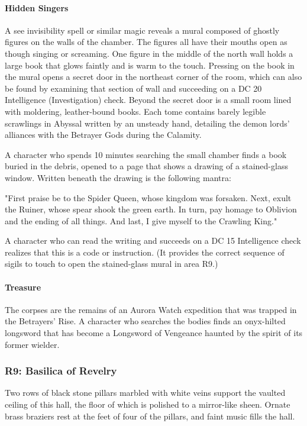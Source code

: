 \documentclass[10pt,a4paper,twoside,bg=print,twocolumn,openany,nodeprecatedcode]{dndbook}
\begin{document}
\paragraph{Hidden Singers}
A see invisibility spell or similar magic reveals a mural composed of ghostly figures on the walls of the chamber. The figures all have their mouths open as though singing or screaming. One figure in the middle of the north wall holds a large book that glows faintly and is warm to the touch. Pressing on the book in the mural opens a secret door in the northeast corner of the room, which can also be found by examining that section of wall and succeeding on a DC 20 Intelligence (Investigation) check. Beyond the secret door is a small room lined with moldering, leather-bound books. Each tome contains barely legible scrawlings in Abyssal written by an unsteady hand, detailing the demon lords' alliances with the Betrayer Gods during the Calamity.

A character who spends 10 minutes searching the small chamber finds a book buried in the debris, opened to a page that shows a drawing of a stained-glass window. Written beneath the drawing is the following mantra:

\begin{DndReadAloud}{}
"First praise be to the Spider Queen, whose kingdom was forsaken. Next, exult the Ruiner, whose spear shook the green earth. In turn, pay homage to Oblivion and the ending of all things. And last, I give myself to the Crawling King."

\end{DndReadAloud}

A character who can read the writing and succeeds on a DC 15 Intelligence check realizes that this is a code or instruction. (It provides the correct sequence of sigils to touch to open the stained-glass mural in area R9.)

\paragraph{Treasure}
The corpses are the remains of an Aurora Watch expedition that was trapped in the Betrayers' Rise. A character who searches the bodies finds an onyx-hilted longsword that has become a Longsword of Vengeance haunted by the spirit of its former wielder.

\subsubsection{R9: Basilica of Revelry}
\begin{DndReadAloud}{}
Two rows of black stone pillars marbled with white veins support the vaulted ceiling of this hall, the floor of which is polished to a mirror-like sheen. Ornate brass braziers rest at the feet of four of the pillars, and faint music fills the hall.

\end{DndReadAloud}
\end{document}
